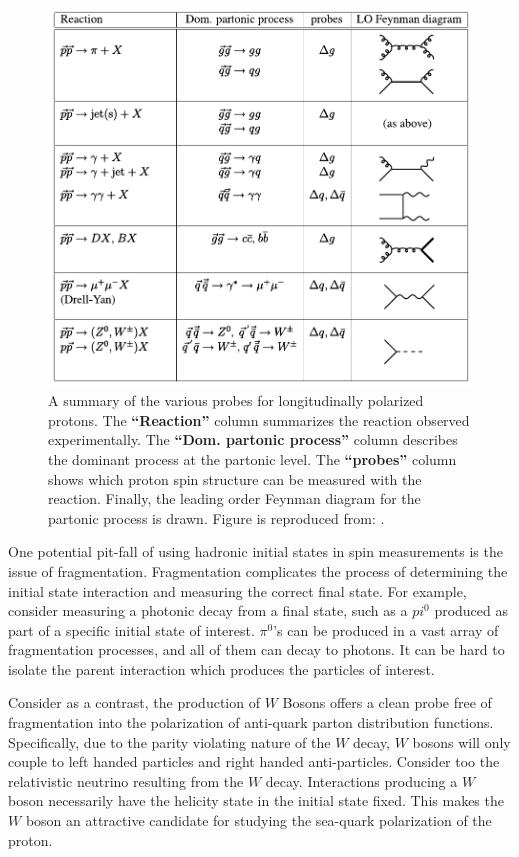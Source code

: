 \begin{figure}[ht]
  \centering
  \includegraphics[width=\linewidth]{./figures/spin_probes.pdf}
  \caption{
    A summary of the various probes for longitudinally polarized protons. The
    \textbf{``Reaction''} column summarizes the reaction observed experimentally.
    The \textbf{``Dom. partonic process''} column describes the dominant process
    at the partonic level. The \textbf{``probes''} column shows which proton spin
    structure can be measured with the reaction. Finally, the leading order
    Feynman diagram for the partonic process is drawn. Figure is reproduced
    from: \cite{Aidala2005}.
  }
  \label{fig:spin_probes_masterspin}

\end{figure}

One potential pit-fall of using hadronic initial states in spin measurements is
the issue of fragmentation. Fragmentation complicates the process of determining
the initial state interaction and measuring the correct final state. For
example, consider measuring a photonic decay from a final state, such as a
$pi^0$ produced as part of a specific initial state of interest. $\pi^0$'s can
be produced in a vast array of fragmentation processes, and all of them can
decay to photons. It can be hard to isolate the parent interaction which
produces the particles of interest. 

Consider as a contrast, the production of $W$ Bosons offers a clean probe free
of fragmentation into the polarization of anti-quark parton distribution
functions. Specifically, due to the parity violating nature of the $W$ decay,
$W$ bosons will only couple to left handed particles and right handed
anti-particles. Consider too the relativistic neutrino resulting from the $W$
decay. Interactions producing a $W$ boson necessarily have the helicity state in
the initial state fixed. This makes the $W$ boson an attractive candidate for
studying the sea-quark polarization of the proton.

